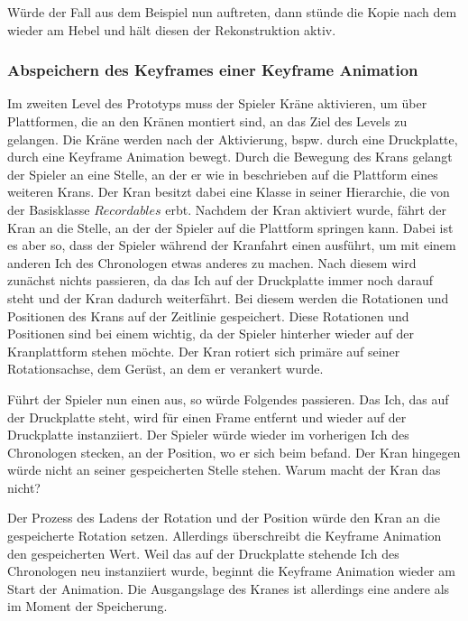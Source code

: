 Würde der Fall aus dem Beispiel nun auftreten, dann stünde die Kopie nach dem  wieder am Hebel und hält diesen der Rekonstruktion aktiv.

\subsubsection{Abspeichern des Keyframes einer Keyframe Animation}
Im zweiten Level des Prototyps muss der Spieler Kräne aktivieren, um über Plattformen, die an den Kränen montiert sind, an das Ziel des Levels zu gelangen. Die Kräne werden nach der Aktivierung, bspw. durch eine Druckplatte, durch eine Keyframe Animation bewegt. Durch die Bewegung des Krans gelangt der Spieler an eine Stelle, an der er wie in  beschrieben auf die Plattform eines weiteren Krans. Der Kran besitzt dabei eine Klasse in seiner Hierarchie, die von der Basisklasse $Recordables$ erbt. Nachdem der Kran aktiviert wurde, fährt der Kran an die Stelle, an der der Spieler auf die Plattform springen kann. Dabei ist es aber so, dass der Spieler während der Kranfahrt einen  ausführt, um mit einem anderen Ich des Chronologen etwas anderes zu machen. Nach diesem  wird zunächst nichts passieren, da das Ich auf der Druckplatte immer noch darauf steht und der Kran dadurch weiterfährt. Bei diesem  werden die Rotationen und Positionen des Krans auf der Zeitlinie gespeichert. Diese Rotationen und Positionen sind bei einem  wichtig, da der Spieler hinterher wieder auf der Kranplattform stehen möchte. Der Kran rotiert sich primäre auf seiner Rotationsachse, dem Gerüst, an dem er verankert wurde. 

Führt der Spieler nun einen  aus, so würde Folgendes passieren. Das Ich, das auf der Druckplatte steht, wird für einen Frame entfernt und wieder auf der Druckplatte instanziiert. Der Spieler würde wieder im vorherigen Ich des Chronologen stecken, an der Position, wo er sich beim  befand. Der Kran hingegen würde nicht an seiner gespeicherten Stelle stehen. Warum macht der Kran das nicht?

Der Prozess des Ladens der Rotation und der Position würde den Kran an die gespeicherte Rotation setzen. Allerdings überschreibt die Keyframe Animation den gespeicherten Wert. Weil das auf der Druckplatte stehende Ich des Chronologen neu instanziiert wurde, beginnt die Keyframe Animation wieder am Start der Animation. Die Ausgangslage des Kranes ist allerdings eine andere als im Moment der Speicherung.  

